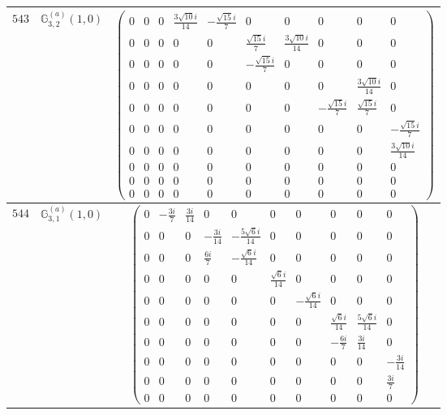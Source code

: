 \documentclass[fleqn,8pt,landscape]{jsarticle}
\begin{document}
\begin{center}
\begin{longtable}{ccc}
$ 543 $ & $ \mathbb{G}_{3,2}^{(a)}(1,0) $ & $ \begin{pmatrix} 0 & 0 & 0 & \frac{3 \sqrt{10} i}{14} & - \frac{\sqrt{15} i}{7} & 0 & 0 & 0 & 0 & 0 \\ 0 & 0 & 0 & 0 & 0 & \frac{\sqrt{15} i}{7} & \frac{3 \sqrt{10} i}{14} & 0 & 0 & 0 \\ 0 & 0 & 0 & 0 & 0 & - \frac{\sqrt{15} i}{7} & 0 & 0 & 0 & 0 \\ 0 & 0 & 0 & 0 & 0 & 0 & 0 & 0 & \frac{3 \sqrt{10} i}{14} & 0 \\ 0 & 0 & 0 & 0 & 0 & 0 & 0 & - \frac{\sqrt{15} i}{7} & \frac{\sqrt{15} i}{7} & 0 \\ 0 & 0 & 0 & 0 & 0 & 0 & 0 & 0 & 0 & - \frac{\sqrt{15} i}{7} \\ 0 & 0 & 0 & 0 & 0 & 0 & 0 & 0 & 0 & \frac{3 \sqrt{10} i}{14} \\ 0 & 0 & 0 & 0 & 0 & 0 & 0 & 0 & 0 & 0 \\ 0 & 0 & 0 & 0 & 0 & 0 & 0 & 0 & 0 & 0 \\ 0 & 0 & 0 & 0 & 0 & 0 & 0 & 0 & 0 & 0 \end{pmatrix} $ \\ \hline
$ 544 $ & $ \mathbb{G}_{3,1}^{(a)}(1,0) $ & $ \begin{pmatrix} 0 & - \frac{3 i}{7} & \frac{3 i}{14} & 0 & 0 & 0 & 0 & 0 & 0 & 0 \\ 0 & 0 & 0 & - \frac{3 i}{14} & - \frac{5 \sqrt{6} i}{14} & 0 & 0 & 0 & 0 & 0 \\ 0 & 0 & 0 & \frac{6 i}{7} & - \frac{\sqrt{6} i}{14} & 0 & 0 & 0 & 0 & 0 \\ 0 & 0 & 0 & 0 & 0 & \frac{\sqrt{6} i}{14} & 0 & 0 & 0 & 0 \\ 0 & 0 & 0 & 0 & 0 & 0 & - \frac{\sqrt{6} i}{14} & 0 & 0 & 0 \\ 0 & 0 & 0 & 0 & 0 & 0 & 0 & \frac{\sqrt{6} i}{14} & \frac{5 \sqrt{6} i}{14} & 0 \\ 0 & 0 & 0 & 0 & 0 & 0 & 0 & - \frac{6 i}{7} & \frac{3 i}{14} & 0 \\ 0 & 0 & 0 & 0 & 0 & 0 & 0 & 0 & 0 & - \frac{3 i}{14} \\ 0 & 0 & 0 & 0 & 0 & 0 & 0 & 0 & 0 & \frac{3 i}{7} \\ 0 & 0 & 0 & 0 & 0 & 0 & 0 & 0 & 0 & 0 \end{pmatrix} $ \\ \hline

\end{longtable}
\end{center}
\end{document}
